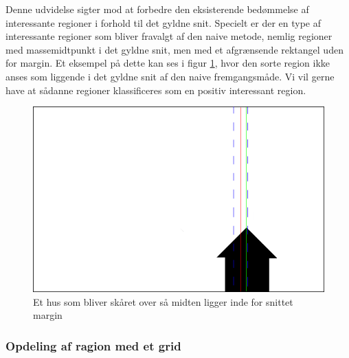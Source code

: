 {
Denne udvidelse sigter mod at forbedre den eksisterende bedømmelse af
interessante regioner i forhold til det gyldne snit. Specielt er der
en type af interessante regioner som bliver fravalgt af den naive
metode, nemlig regioner med massemidtpunkt i det gyldne snit, men med et
afgrænsende rektangel uden for margin. Et eksempel på dette kan ses i
figur \ref{hus}, hvor den sorte region ikke anses som liggende i det
gyldne snit af den naive fremgangsmåde. Vi vil gerne have at sådanne
regioner klassificeres som en positiv interessant region.

\begin{figure}[h]
	\begin{center}
		\includegraphics[scale=0.3,angle=0]{afsnit/vores_implementation/billeder/udvidet_loesning/husworks.png}
	\end{center}
	\caption[]{Et hus som bliver skåret over så midten ligger inde for snittet margin}
	\label{hus}
\end{figure}


\subsubsection{Opdeling af ragion med et grid}

}
